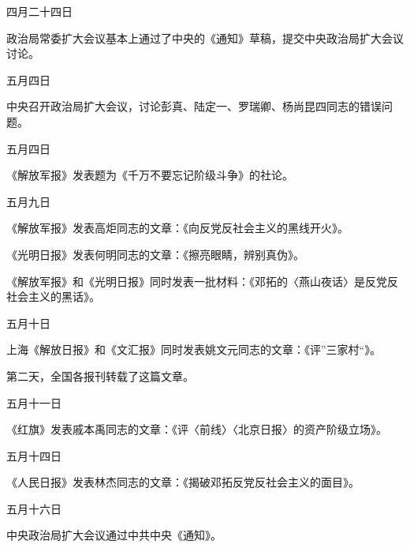 \begin{maonote}
四月二十四日

政治局常委扩大会议基本上通过了中央的《通知》草稿，提交中央政治局扩大会议讨论。

五月四日

中央召开政治局扩大会议，讨论彭真、陆定一、罗瑞卿、杨尚昆四同志的错误问题。

五月四日

《解放军报》发表题为《千万不要忘记阶级斗争》的社论。

五月九日

《解放军报》发表高炬同志的文章：《向反党反社会主义的黑线开火》。

《光明日报》发表何明同志的文章：《擦亮眼睛，辨别真伪》。

《解放军报》和《光明日报》同时发表一批材料：《邓拓的〈燕山夜话〉是反党反社会主义的黑话》。

五月十日

上海《解放日报》和《文汇报》同时发表姚文元同志的文章：《评”三家村“》。

第二天，全国各报刊转载了这篇文章。

五月十一日

《红旗》发表戚本禹同志的文章：《评〈前线〉〈北京日报〉的资产阶级立场》。

五月十四日

《人民日报》发表林杰同志的文章：《揭破邓拓反党反社会主义的面目》。

五月十六日

中央政治局扩大会议通过中共中央《通知》。
\end{maonote}
